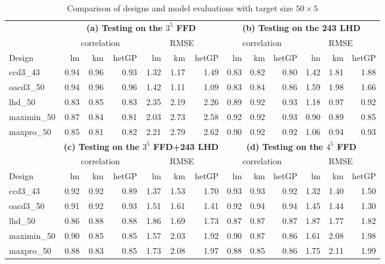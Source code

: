 \documentclass [PhD] {package/uclathes}
\begin{document}
\begin{table}

\caption{\label{tab:tab2}Comparison of designs and model evaluations with target size $50 \times 5$}
\centering
\begin{tabular}[t]{|l|r|r|r|r|r|r|r|r|r|r|r|r|}
\hline
\multicolumn{1}{|c|}{\textbf{ }} & \multicolumn{6}{|c|}{\textbf{(a) Testing on the $3^5$ FFD}} & \multicolumn{6}{|c|}{\textbf{(b) Testing on the 243 LHD}} \\
\cline{2-7} \cline{8-13}
\multicolumn{1}{|c|}{ } & \multicolumn{3}{|c|}{correlation} & \multicolumn{3}{|c|}{RMSE} & \multicolumn{3}{|c|}{correlation} & \multicolumn{3}{|c|}{RMSE} \\
\cline{2-4} \cline{5-7} \cline{8-10} \cline{11-13}
Design & lm & km & hetGP & lm & km & hetGP & lm & km & hetGP & lm & km & hetGP\\
\hline
ccd3\_43 & 0.94 & 0.96 & 0.93 & 1.32 & 1.17 & 1.49 & 0.83 & 0.82 & 0.80 & 1.42 & 1.81 & 1.88\\
\hline
oacd3\_50 & 0.94 & 0.96 & 0.96 & 1.42 & 1.11 & 1.09 & 0.83 & 0.84 & 0.86 & 1.59 & 1.98 & 1.66\\
\hline
lhd\_50 & 0.83 & 0.85 & 0.83 & 2.35 & 2.19 & 2.26 & 0.89 & 0.92 & 0.93 & 1.18 & 0.97 & 0.92\\
\hline
maximin\_50 & 0.87 & 0.84 & 0.81 & 2.03 & 2.73 & 2.58 & 0.92 & 0.92 & 0.93 & 0.90 & 0.89 & 0.85\\
\hline
maxpro\_50 & 0.85 & 0.81 & 0.82 & 2.21 & 2.79 & 2.62 & 0.90 & 0.92 & 0.92 & 1.06 & 0.94 & 0.93\\
\hline
 

\multicolumn{1}{|c|}{\textbf{ }} & \multicolumn{6}{|c|}{\textbf{(c) Testing on the $3^5$ FFD+243 LHD}} & \multicolumn{6}{|c|}{\textbf{(d) Testing on the $4^5$ FFD}} \\
\cline{2-7} \cline{8-13}
\multicolumn{1}{|c|}{ } & \multicolumn{3}{|c|}{correlation} & \multicolumn{3}{|c|}{RMSE} & \multicolumn{3}{|c|}{correlation} & \multicolumn{3}{|c|}{RMSE} \\
\cline{2-4} \cline{5-7} \cline{8-10} \cline{11-13}
Design & lm & km & hetGP & lm & km & hetGP & lm & km & hetGP & lm & km & hetGP\\
\hline
ccd3\_43 & 0.92 & 0.92 & 0.89 & 1.37 & 1.53 & 1.70 & 0.93 & 0.93 & 0.92 & 1.32 & 1.40 & 1.50\\
\hline
oacd3\_50 & 0.91 & 0.92 & 0.93 & 1.51 & 1.61 & 1.41 & 0.92 & 0.94 & 0.94 & 1.45 & 1.44 & 1.30\\
\hline
lhd\_50 & 0.86 & 0.88 & 0.88 & 1.86 & 1.69 & 1.73 & 0.87 & 0.87 & 0.87 & 1.87 & 1.77 & 1.82\\
\hline
maximin\_50 & 0.90 & 0.85 & 0.85 & 1.57 & 2.03 & 1.92 & 0.90 & 0.87 & 0.86 & 1.61 & 2.08 & 1.98\\
\hline
maxpro\_50 & 0.88 & 0.83 & 0.85 & 1.73 & 2.08 & 1.97 & 0.88 & 0.85 & 0.86 & 1.75 & 2.11 & 1.99\\
\hline
\end{tabular}
\end{table} 
\end{document}
